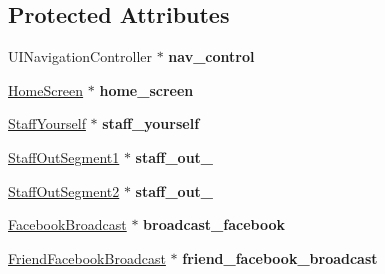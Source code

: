 \subsection*{\-Protected \-Attributes}
\begin{DoxyCompactItemize}
\item 
\hypertarget{interface_dashboard_controller_ac50a03f09f13767cb62d25f8d654104f}{
\-U\-I\-Navigation\-Controller $\ast$ {\bfseries nav\-\_\-control}}
\label{interface_dashboard_controller_ac50a03f09f13767cb62d25f8d654104f}

\item 
\hypertarget{interface_dashboard_controller_a4b08a05f08c511a516503178786d0e40}{
\hyperlink{interface_home_screen}{\-Home\-Screen} $\ast$ {\bfseries home\-\_\-screen}}
\label{interface_dashboard_controller_a4b08a05f08c511a516503178786d0e40}

\item 
\hypertarget{interface_dashboard_controller_ae6cfaa4e4b8cdc2caa50e488262c6ded}{
\hyperlink{interface_staff_yourself}{\-Staff\-Yourself} $\ast$ {\bfseries staff\-\_\-yourself}}
\label{interface_dashboard_controller_ae6cfaa4e4b8cdc2caa50e488262c6ded}

\item 
\hypertarget{interface_dashboard_controller_aa147179c962ad10bb5ada1bcc2b6ab6a}{
\hyperlink{interface_staff_out_segment1}{\-Staff\-Out\-Segment1} $\ast$ {\bfseries staff\-\_\-out\-\_}}
\label{interface_dashboard_controller_aa147179c962ad10bb5ada1bcc2b6ab6a}

\item 
\hypertarget{interface_dashboard_controller_aec59a6d236af1e647d06068652249a07}{
\hyperlink{interface_staff_out_segment2}{\-Staff\-Out\-Segment2} $\ast$ {\bfseries staff\-\_\-out\-\_}}
\label{interface_dashboard_controller_aec59a6d236af1e647d06068652249a07}

\item 
\hypertarget{interface_dashboard_controller_a57e0adf4f863394414e0d3c991868b2d}{
\hyperlink{interface_facebook_broadcast}{\-Facebook\-Broadcast} $\ast$ {\bfseries broadcast\-\_\-facebook}}
\label{interface_dashboard_controller_a57e0adf4f863394414e0d3c991868b2d}

\item 
\hypertarget{interface_dashboard_controller_a1e69af0a98f3717c3a876188eb734363}{
\hyperlink{interface_friend_facebook_broadcast}{\-Friend\-Facebook\-Broadcast} $\ast$ {\bfseries friend\-\_\-facebook\-\_\-broadcast}}
\label{interface_dashboard_controller_a1e69af0a98f3717c3a876188eb734363}


\end{DoxyCompactItemize}
